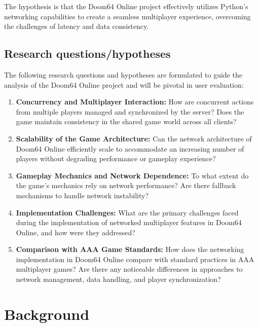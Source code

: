 The hypothesis is that the Doom64 Online project effectively utilizes Python's networking capabilities to create a seamless multiplayer experience, overcoming the challenges of latency and data consistency.



\subsection{Research questions/hypotheses}
\label{sec:question}

The following research questions and hypotheses are formulated to guide the analysis of the Doom64 Online project and will be pivotal in user evaluation:

\begin{enumerate}
    
    \item \textbf{Concurrency and Multiplayer Interaction:} How are concurrent actions from multiple players managed and synchronized by the server? Does the game maintain consistency in the shared game world across all clients?
    
    \item \textbf{Scalability of the Game Architecture:} Can the network architecture of Doom64 Online efficiently scale to accommodate an increasing number of players without degrading performance or gameplay experience?
    
    \item \textbf{Gameplay Mechanics and Network Dependence:} To what extent do the game's mechanics rely on network performance? Are there fallback mechanisms to handle network instability?
    
    \item \textbf{Implementation Challenges:} What are the primary challenges faced during the implementation of networked multiplayer features in Doom64 Online, and how were they addressed?
    
    \item \textbf{Comparison with AAA Game Standards:} How does the networking implementation in Doom64 Online compare with standard practices in AAA multiplayer games? Are there any noticeable differences in approaches to network management, data handling, and player synchronization?
    
\end{enumerate}
\section{Background}
\label{chap:background}


